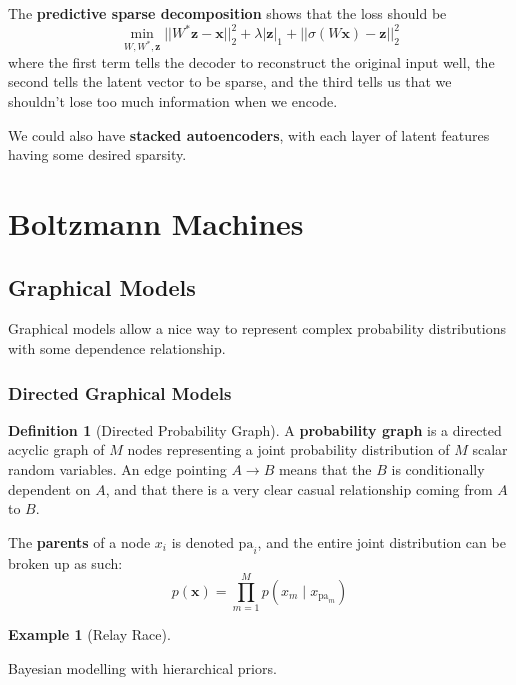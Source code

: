 \documentclass{article}
\theoremstyle{definition}
\newtheorem{example}{Example}[section]
\theoremstyle{remark}
\theoremstyle{definition}
\newtheorem{definition}{Definition}[section]
\begin{document}
The \textbf{predictive sparse decomposition} shows that the loss should be 
\[\min_{W, W^\ast, \mathbf{z}} ||W^\ast \mathbf{z} - \mathbf{x}||^2_2 + \lambda | \mathbf{z}|_1 + ||\sigma(W \mathbf{x}) - \mathbf{z}||^2_2\]
where the first term tells the decoder to reconstruct the original input well, the second tells the latent vector to be sparse, and the third tells us that we shouldn't lose too much information when we encode. 

We could also have \textbf{stacked autoencoders}, with each layer of latent features having some desired sparsity. 



\section{Boltzmann Machines} 

\subsection{Graphical Models}
 
Graphical models allow a nice way to represent complex probability distributions with some dependence relationship. 

\subsubsection{Directed Graphical Models}


\begin{definition}[Directed Probability Graph]  
A \textbf{probability graph} is a directed acyclic graph of $M$ nodes representing a joint probability distribution of $M$ scalar random variables. An edge pointing $A \rightarrow B$ means that the $B$ is conditionally dependent on $A$, and that there is a very clear casual relationship coming from $A$ to $B$. 
\begin{center}

\end{center}
The \textbf{parents} of a node $x_i$ is denoted $\mathrm{pa}_i$, and the entire joint distribution can be broken up as such: 
\[p(\mathbf{x}) = \prod_{m=1}^M p(x_m \mid x_{\mathrm{pa}_m})\]
\end{definition}


\begin{example}[Relay Race]

\end{example} 


Bayesian modelling with hierarchical priors. 
\end{document}
